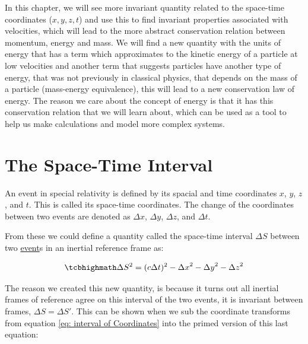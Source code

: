 In this chapter, we will see more invariant quantity related to the space-time coordinates ($x,y,z,t$) and use this to find invariant properties associated with velocities, which will lead to the more abstract conservation relation between momentum, energy and mass.
We will find a new quantity with the units of energy that has a term which approximates to the kinetic energy of a particle at low velocities and another term that suggests particles have another type of energy, that was not previously in classical physics, that depends on the mass of a particle (mass-energy equivalence), this will lead to a new conservation law of energy.
The reason we care about the concept of energy is that it has this conservation relation that we will learn about, which can be used as a tool to help us make calculations and model more complex systems.

\section{The Space-Time Interval} \label{sect: Space-Time Interval}

An event in special relativity is defined by its spacial and time coordinates $x$, $y$, $z$, and $t$. This is called its space-time coordinates.
The change of the coordinates between two events are denoted as ${\Delta x}$, ${\Delta y}$, ${\Delta z}$, and ${\Delta t}$.

From these we could define a quantity called the space-time interval $\Delta S$ between two \hyperlink{def-event}{event}s in an inertial reference frame as:

\begin{equation}
	\mhl{
	\Delta S^2 = (c\Delta t)^2-{\Delta x}^2-{\Delta y}^2-{\Delta z}^2
	}
	\label{eq: space-time interval}
\end{equation}

The reason we created this new quantity, is because it turns out all inertial frames of reference agree on this interval of the two events, it is invariant between frames, $\Delta S = \Delta S{'}$.
This can be shown when we sub the coordinate transforms from equation \eqref{eq: interval of Coordinates} into the primed version of this last equation:

